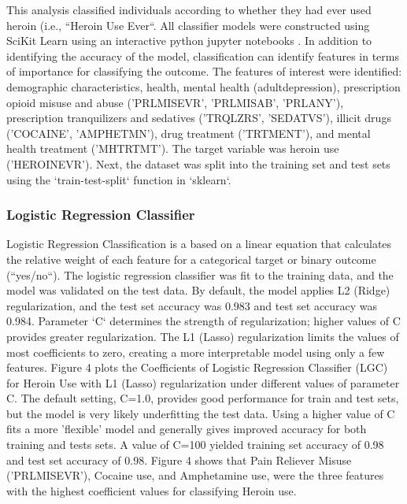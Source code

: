 \documentclass[sigconf]{acmart}
\begin{document}
This analysis classified individuals according to whether they had ever used 
heroin (i.e., ``Heroin Use Ever``. All classifier models were constructed using 
SciKit Learn \cite{muller17} using an interactive python jupyter notebooks  
\cite{classifyH}. In addition to identifying the accuracy of the model, 
classification can identify features in terms of importance for classifying the 
outcome. The features of interest were identified: demographic characteristics, 
health, mental health (adultdepression), prescription opioid misuse and abuse 
('PRLMISEVR', 'PRLMISAB', 'PRLANY'), prescription tranquilizers and sedatives 
('TRQLZRS', 'SEDATVS'), illicit drugs ('COCAINE', 'AMPHETMN'), drug treatment 
('TRTMENT'), and mental health treatment ('MHTRTMT'). The target variable was 
heroin use ('HEROINEVR'). Next, the dataset was split into the training set 
and test sets using the `train-test-split` function in `sklearn`.

\subsubsection{Logistic Regression Classifier}

Logistic Regression Classification is a based on a linear equation that 
calculates the relative weight of each feature for a categorical target or 
binary outcome (``yes/no``). The logistic regression classifier was fit to 
the training data, and the model was validated on the test data. By default, 
the model applies L2 (Ridge) regularization, and the test set accuracy 
was 0.983 and test set accuracy was 0.984. Parameter `C` determines the 
strength of regularization; higher values of C provides greater regularization. 
The L1 (Lasso) regularization limits the values of most coefficients to zero, 
creating a more interpretable model using only a few features. Figure 4 plots 
the Coefficients of Logistic Regression Classifier (LGC) for Heroin Use with 
L1 (Lasso) regularization under different values of parameter C. The default 
setting, C=1.0, provides good performance for train and test sets, but the 
model is very likely underfitting the test data. Using a higher value of C 
fits a more 'flexible' model and generally gives improved accuracy for both 
training and tests sets. A value of C=100 yielded training set accuracy of
0.98 and test set accuracy of 0.98. Figure 4 shows that Pain Reliever Misuse
('PRLMISEVR'), Cocaine use, and Amphetamine use, were the three features
with the highest coefficient values for classifying Heroin use. 
\end{document}
